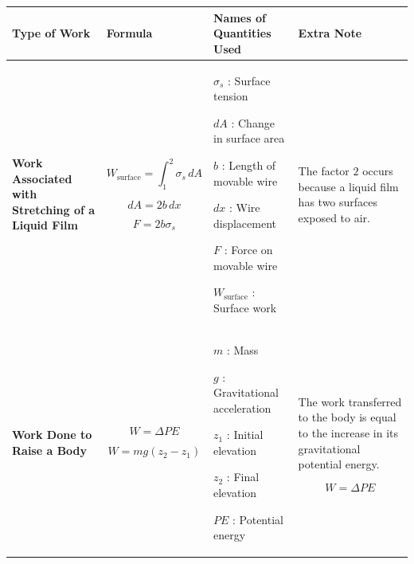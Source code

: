 \documentclass[12pt]{article}
\begin{document}
\begin{center}
\vspace*{-1cm}
\hspace*{-2cm}
\renewcommand{\arraystretch}{1.5}
\begin{tabular}{|p{3.2cm}|p{5.2cm}|p{5.0cm}|p{5.0cm}|}
\hline
\textbf{Type of Work} &
\textbf{Formula} &
\textbf{Names of Quantities Used} &
\textbf{Extra Note} \\
\hline


\textbf{Work Associated with Stretching of a Liquid Film}
&
\begin{equation*}
W_{\mathrm{surface}}
=
\int_1^2 \sigma_s\,dA
\end{equation*}

\begin{equation*}
dA=2b\,dx
\end{equation*}

\begin{equation*}
F=2b\sigma_s
\end{equation*}
&
$\sigma_s$ : Surface tension

$dA$ : Change in surface area

$b$ : Length of movable wire

$dx$ : Wire displacement

$F$ : Force on movable wire

$W_{\mathrm{surface}}$ : Surface work
&

The factor $2$ occurs because a liquid film has two surfaces exposed to air.
\\
\hline

\textbf{Work Done to Raise a Body}
&
\begin{equation*}
W=\Delta PE
\end{equation*}

\begin{equation*}
W=mg(z_2-z_1)
\end{equation*}
&
$m$ : Mass

$g$ : Gravitational acceleration

$z_1$ : Initial elevation

$z_2$ : Final elevation

$PE$ : Potential energy
&
The work transferred to the body is equal to the increase in its gravitational potential energy.

\begin{equation*}
W=\Delta PE
\end{equation*}
\\
\hline


\end{tabular}
\end{center}
\end{document}

